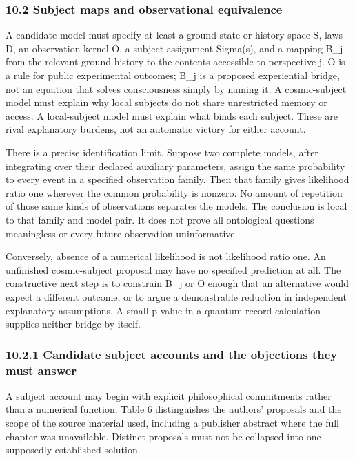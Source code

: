 \documentclass[
  10pt,
  a4paper,
]{article}
\begin{document}
\subsubsection{10.2 Subject maps and observational
equivalence}\label{subject-maps-and-observational-equivalence}

A candidate model must specify at least a ground-state or history space
S, laws D, an observation kernel O, a subject assignment Sigma(s), and a
mapping B\_j from the relevant ground history to the contents accessible
to perspective j. O is a rule for public experimental outcomes; B\_j is
a proposed experiential bridge, not an equation that solves
consciousness simply by naming it. A cosmic-subject model must explain
why local subjects do not share unrestricted memory or access. A
local-subject model must explain what binds each subject. These are
rival explanatory burdens, not an automatic victory for either account.

There is a precise identification limit. Suppose two complete models,
after integrating over their declared auxiliary parameters, assign the
same probability to every event in a specified observation family. Then
that family gives likelihood ratio one wherever the common probability
is nonzero. No amount of repetition of those same kinds of observations
separates the models. The conclusion is local to that family and model
pair. It does not prove all ontological questions meaningless or every
future observation uninformative.

Conversely, absence of a numerical likelihood is not likelihood ratio
one. An unfinished cosmic-subject proposal may have no specified
prediction at all. The constructive next step is to constrain B\_j or O
enough that an alternative would expect a different outcome, or to argue
a demonstrable reduction in independent explanatory assumptions. A small
p-value in a quantum-record calculation supplies neither bridge by
itself.

\subsubsection{10.2.1 Candidate subject accounts and the objections they
must
answer}\label{candidate-subject-accounts-and-the-objections-they-must-answer}

A subject account may begin with explicit philosophical commitments
rather than a numerical function. Table 6 distinguishes the authors'
proposals and the scope of the source material used, including a
publisher abstract where the full chapter was unavailable. Distinct
proposals must not be collapsed into one supposedly established
solution.
\end{document}
